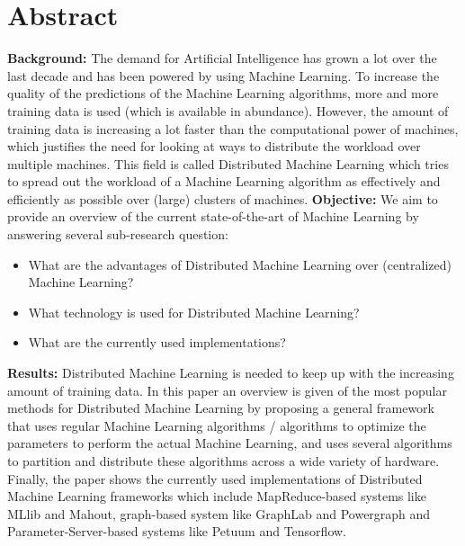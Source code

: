 \section{Abstract}
\textbf{Background:} The demand for Artificial Intelligence has grown a lot over the last decade and has been powered by using Machine Learning. To increase the quality of the predictions of the Machine Learning algorithms, more and more training data is used (which is available in abundance). However, the amount of training data is increasing a lot faster than the computational power of machines, which justifies the need for looking at ways to distribute the workload over multiple machines. This field is called Distributed Machine Learning which tries to spread out the workload of a Machine Learning algorithm as effectively and efficiently as possible over (large) clusters of machines.
\textbf{Objective:} We aim to provide an overview of the current state-of-the-art of Machine Learning by answering several sub-research question:
\begin{itemize}
	\item What are the advantages of Distributed Machine Learning over (centralized) Machine Learning?
	\item What technology is used for Distributed Machine Learning?
	\item What are the currently used implementations?
\end{itemize}
\textbf{Results:} Distributed Machine Learning is needed to keep up with the increasing amount of training data. In this paper an overview is given of the most popular methods for Distributed Machine Learning by proposing a general framework that uses regular Machine Learning algorithms / algorithms to optimize the parameters to perform the actual Machine Learning, and uses several algorithms to partition and distribute these algorithms across a wide variety of hardware. Finally, the paper shows the currently used implementations of Distributed Machine Learning frameworks which include MapReduce-based systems like MLlib and Mahout, graph-based system like GraphLab and Powergraph and Parameter-Server-based systems like Petuum and Tensorflow.